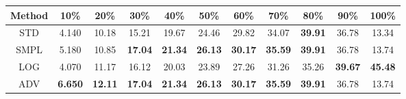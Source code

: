 \documentclass{standalone}
\begin{document}
\begin{tabular}{c|cccccccccc}
      \toprule
      Method & 10\% & 20\% & 30\% & 40\% & 50\% & 60\% & 70\% & 80\% & 90\% & 100\% \\
      \midrule
STD & 4.140 & 10.18 & 15.21 & 19.67 & 24.46 & 29.82 & 34.07 & \textbf{39.91} & 36.78 & 13.34\\
SMPL & 5.180 & 10.85 & \textbf{17.04} & \textbf{21.34} & \textbf{26.13} & \textbf{30.17} & \textbf{35.59} & \textbf{39.91} & 36.78 & 13.74\\
LOG & 4.070 & 11.17 & 16.12 & 20.03 & 23.89 & 27.26 & 31.26 & 35.26 & \textbf{39.67} & \textbf{45.48}\\
ADV & \textbf{6.650} & \textbf{12.11} & \textbf{17.04} & \textbf{21.34} & \textbf{26.13} & \textbf{30.17} & \textbf{35.59} & \textbf{39.91} & 36.78 & 13.74\\
  \bottomrule
\end{tabular}
\end{document}
